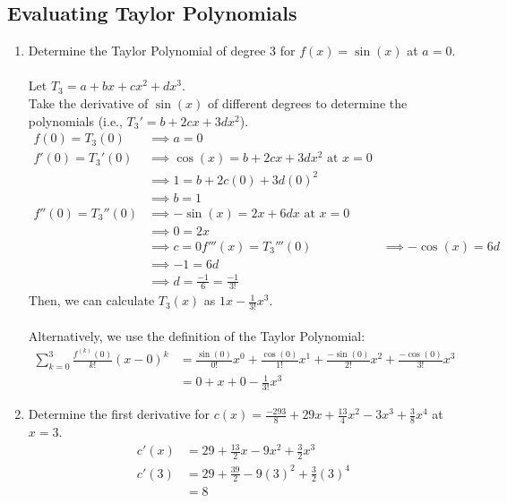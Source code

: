 \documentclass{article}
\begin{document}
\subsection{Evaluating Taylor Polynomials}
\begin{enumerate}
    \item Determine the Taylor Polynomial of degree 3 for $f(x) = \sin(x)$ at $a = 0$.\\
    \\
    Let $T_3 = a + bx + cx^2 + dx^3$.\\
    Take the derivative of $\sin(x)$ of different degrees to determine the polynomials (i.e., $T_3' = b + 2cx + 3dx^2$).
    \begin{align*}
        f(0) = T_3(0) & \implies a = 0\\
        f'(0) = T_3'(0) & \implies \cos(x) = b + 2cx + 3dx^2 \text{ at } x=0\\
        & \implies 1 = b + 2c(0) + 3d(0)^2\\
        & \implies b = 1\\
        f''(0) = T_3''(0) & \implies -\sin(x) = 2x + 6dx \text{ at } x=0\\
        & \implies 0 = 2x\\
        & \implies c = 0
        f'''(x) = T_3'''(0) & \implies -\cos(x) = 6d\\
        & \implies -1 = 6d\\
        & \implies d = \frac{-1}{6} = \frac{-1}{3!}
    \end{align*}
    Then, we can calculate $T_3(x)$ as  $1x - \frac{1}{3!}x^3$.\\
    \\
    Alternatively, we use the definition of the Taylor Polynomial:
    \begin{align*}
        \sum_{k=0}^3 \frac{f^{(k)}(0)}{k!}(x-0)^k & = \frac{\sin(0)}{0!}x^0 + \frac{\cos(0)}{1!}x^1 + \frac{-\sin(0)}{2!}x^2 + \frac{-\cos(0)}{3!}x^3\\
        & = 0 + x + 0 - \frac{1}{3!}x^3
    \end{align*}
    
    \item Determine the first derivative for $c(x) = \frac{-293}{8} + 29x + \frac{13}{4} x^2 - 3x^3 + \frac{3}{8}x^4$ at $x = 3$.\\
    \begin{align*}
        c'(x) & = 29 + \frac{13}{2}x - 9x^2 + \frac{3}{2}x^3\\
        c'(3) & = 29 + \frac{39}{2} - 9(3)^2 + \frac{3}{2}(3)^4\\
        & = 8
    \end{align*}
    

\end{enumerate}
\end{document}

